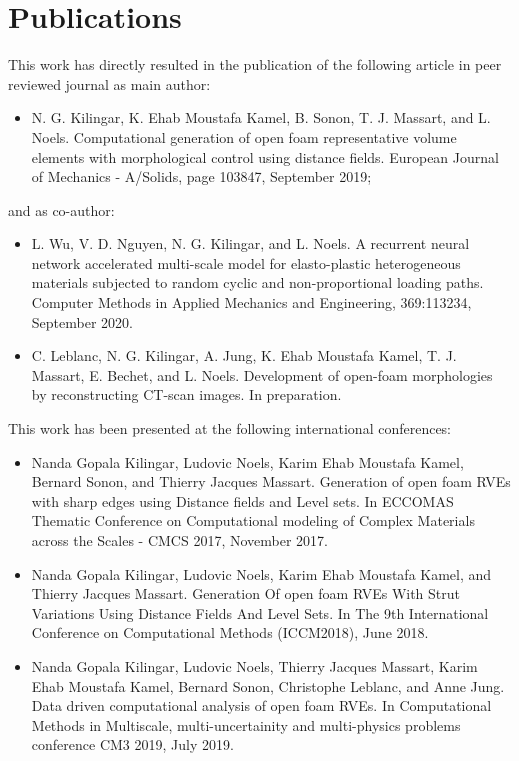 \section{Publications}

This work has directly resulted in the publication of the following article in peer reviewed journal as main author:
\begin{itemize}
	\item N. G. Kilingar, K. Ehab Moustafa Kamel, B. Sonon, T. J. Massart, and L. Noels.
	Computational generation of open foam representative volume elements with morphological control using distance fields. 
	European Journal of Mechanics - A/Solids,
	page 103847, September 2019;
\end{itemize}
and as co-author:
\begin{itemize}
	\item L. Wu, V. D. Nguyen, N. G. Kilingar, and L. Noels. 
	A recurrent neural network accelerated multi-scale model for elasto-plastic heterogeneous materials subjected to random cyclic and non-proportional loading paths.
	Computer Methods in Applied Mechanics and Engineering, 
	369:113234, September 2020.
	\item C. Leblanc, N. G. Kilingar, A. Jung, K. Ehab Moustafa Kamel, T. J. Massart, E. Bechet, and L. Noels. 
	Development of open-foam morphologies by reconstructing CT-scan images.
	In preparation.
\end{itemize}
This work has been presented at the following international conferences:
\begin{itemize}
	\item Nanda Gopala Kilingar, Ludovic Noels, Karim Ehab Moustafa Kamel, Bernard Sonon,
	and Thierry Jacques Massart. Generation of open foam RVEs with sharp edges using Distance fields and Level sets. In ECCOMAS Thematic Conference on Computational modeling of Complex Materials across the Scales - CMCS 2017, November 2017.
	\item Nanda Gopala Kilingar, Ludovic Noels, Karim Ehab Moustafa Kamel,
	and Thierry Jacques Massart.
	Generation Of open foam RVEs
	With Strut Variations Using Distance Fields And Level Sets.
	In
	The 9th International Conference on Computational Methods
	(ICCM2018), June 2018.
	\item Nanda Gopala Kilingar, Ludovic Noels, Thierry Jacques Massart, Karim Ehab
	Moustafa Kamel, Bernard Sonon, Christophe Leblanc, and Anne Jung. Data
	driven computational analysis of open foam RVEs. In Computational Methods in Multiscale, multi-uncertainity and multi-physics problems conference
	CM3 2019, July 2019.
\end{itemize}
